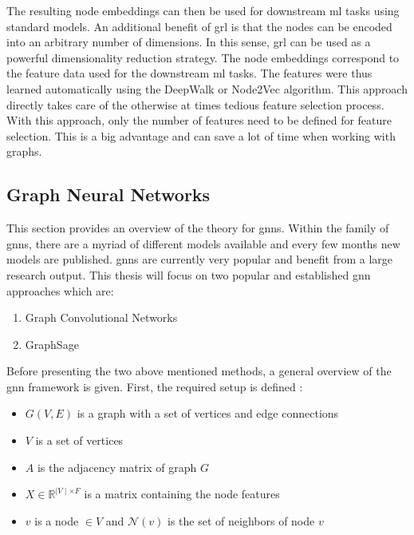 	\noindent The resulting node embeddings can then be used for downstream
	\acs{ml} tasks using standard models. An additional benefit of \acs{grl} is 
	that the nodes can be encoded into an arbitrary number of dimensions. In 
	this sense, \acs{grl} can be used as a powerful dimensionality reduction 
	strategy. The node embeddings correspond to the feature data used for the 
	downstream \acs{ml} tasks. The features were thus learned automatically using 
	the DeepWalk or Node2Vec algorithm. This approach directly takes care of the 
	otherwise at times tedious feature selection process. With this approach, 
	only the number of features need to be defined for feature selection. This 
	is a big advantage and can save a lot of time when working with graphs. 

	\subsection{Graph Neural Networks}
	\label{section:GNN_theory}

	This section provides an overview of the theory for \acfp{gnn}. Within the 
	family of \acsp{gnn}, there are a myriad of different models available and 
	every few months new models are published. \acsp{gnn} are currently very 
	popular and benefit from a large research output. This thesis will 
	focus on two popular and established \acs{gnn} approaches which are:

	\begin{enumerate}
		\item Graph Convolutional Networks
		\item GraphSage
	\end{enumerate}
	
	\noindent Before presenting the two above mentioned methods, a general
	overview of the \acs{gnn} framework is given. First, the required setup is 
	defined \citep{leskovec2021lecture}:

	\begin{itemize}
		\setlength\itemsep{0.2em}
		\item $G(V,E)$ is a graph with a set of vertices and edge connections
		\item $V$ is a set of vertices
		\item $A$ is the adjacency matrix of graph $G$
		\item $X \in \mathbb{R}^{\mid V\mid \times F}$ is a matrix containing
			the node features
		\item $v$ is a node $\in V$ and $\mathcal{N}(v)$ is the set of 
			neighbors of node $v$
	\end{itemize}

